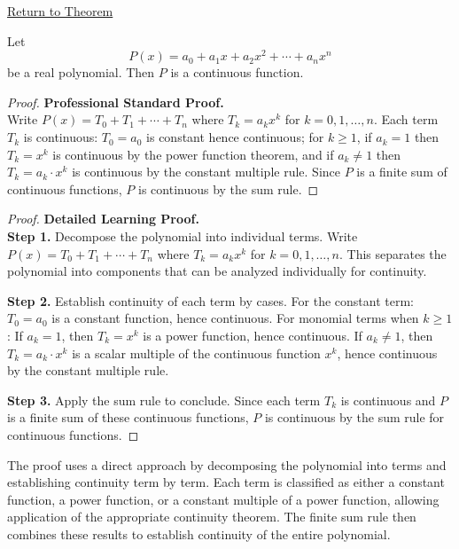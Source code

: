 \newpage
{}
\label{prf:polynomials-are-continuous}

\begin{remark*}[Return]
\hyperref[thm:polynomials-are-continuous]{Return to Theorem}
\end{remark*}

\begin{theorem*}
Let
\[
  P(x) = a_0 + a_1 x + a_2 x^2 + \cdots + a_n x^n
\]
be a real polynomial. Then $P$ is a continuous function.
\end{theorem*}

\begin{proof}
\textbf{Professional Standard Proof.}~\\
Write $P(x) = T_0 + T_1 + \cdots + T_n$ where $T_k = a_k x^k$ for $k = 0, 1, \ldots, n$. Each term $T_k$ is continuous: $T_0 = a_0$ is constant hence continuous; for $k \geq 1$, if $a_k = 1$ then $T_k = x^k$ is continuous by the power function theorem, and if $a_k \neq 1$ then $T_k = a_k \cdot x^k$ is continuous by the constant multiple rule. Since $P$ is a finite sum of continuous functions, $P$ is continuous by the sum rule.
\end{proof}

\begin{proof}
\textbf{Detailed Learning Proof.}~\\

\textbf{Step 1.} Decompose the polynomial into individual terms.
Write $P(x) = T_0 + T_1 + \cdots + T_n$ where $T_k = a_k x^k$ for $k = 0, 1, \ldots, n$. This separates the polynomial into components that can be analyzed individually for continuity.

\textbf{Step 2.} Establish continuity of each term by cases.
For the constant term: $T_0 = a_0$ is a constant function, hence continuous.
For monomial terms when $k \geq 1$: If $a_k = 1$, then $T_k = x^k$ is a power function, hence continuous. If $a_k \neq 1$, then $T_k = a_k \cdot x^k$ is a scalar multiple of the continuous function $x^k$, hence continuous by the constant multiple rule.

\textbf{Step 3.} Apply the sum rule to conclude.
Since each term $T_k$ is continuous and $P$ is a finite sum of these continuous functions, $P$ is continuous by the sum rule for continuous functions.
\end{proof}

\begin{remark*}
The proof uses a direct approach by decomposing the polynomial into terms and establishing continuity term by term. Each term is classified as either a constant function, a power function, or a constant multiple of a power function, allowing application of the appropriate continuity theorem. The finite sum rule then combines these results to establish continuity of the entire polynomial.
\end{remark*}

